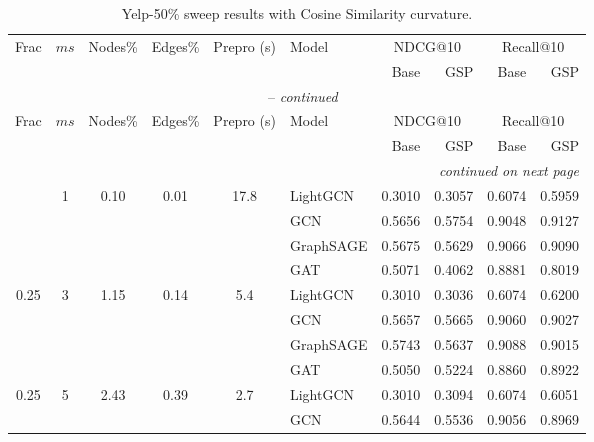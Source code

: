{\footnotesize
\setlength{\tabcolsep}{4pt}
\begin{longtable}{cccccl rrrr}
\caption{Yelp-50\% sweep results with Cosine Similarity curvature.}
\label{tab:yelp_cosine_sweep} \\
\toprule
\multirow{2}{*}{Frac} & \multirow{2}{*}{$ms$} & \multirow{2}{*}{Nodes\%} & \multirow{2}{*}{Edges\%} & \multirow{2}{*}{Prepro (s)} & \multirow{2}{*}{Model} &
  \multicolumn{2}{c}{NDCG@10} & \multicolumn{2}{c}{Recall@10} \\
\cmidrule(lr){7-8}\cmidrule(lr){9-10}
 & & & & & & Base & GSP & Base & GSP \\
\midrule
\endfirsthead
\multicolumn{10}{c}{\tablename~\thetable{} -- \textit{continued}} \\
\toprule
\multirow{2}{*}{Frac} & \multirow{2}{*}{$ms$} & \multirow{2}{*}{Nodes\%} & \multirow{2}{*}{Edges\%} & \multirow{2}{*}{Prepro (s)} & \multirow{2}{*}{Model} &
  \multicolumn{2}{c}{NDCG@10} & \multicolumn{2}{c}{Recall@10} \\
\cmidrule(lr){7-8}\cmidrule(lr){9-10}
 & & & & & & Base & GSP & Base & GSP \\
\midrule
\endhead
\midrule \multicolumn{10}{r}{\textit{continued on next page}} \\
\endfoot
\bottomrule
\endlastfoot
\multirow{4}{*}{0.25} & \multirow{4}{*}{1} & \multirow{4}{*}{0.10} & \multirow{4}{*}{0.01} & \multirow{4}{*}{17.8} & LightGCN & 0.3010 & 0.3057 & 0.6074 & 0.5959 \\
 & & & & & GCN & 0.5656 & 0.5754 & 0.9048 & 0.9127 \\
 & & & & & GraphSAGE & 0.5675 & 0.5629 & 0.9066 & 0.9090 \\
 & & & & & GAT & 0.5071 & 0.4062 & 0.8881 & 0.8019 \\
\midrule
\multirow{4}{*}{0.25} & \multirow{4}{*}{3} & \multirow{4}{*}{1.15} & \multirow{4}{*}{0.14} & \multirow{4}{*}{5.4} & LightGCN & 0.3010 & 0.3036 & 0.6074 & 0.6200 \\
 & & & & & GCN & 0.5657 & 0.5665 & 0.9060 & 0.9027 \\
 & & & & & GraphSAGE & 0.5743 & 0.5637 & 0.9088 & 0.9015 \\
 & & & & & GAT & 0.5050 & 0.5224 & 0.8860 & 0.8922 \\
\midrule
\multirow{4}{*}{0.25} & \multirow{4}{*}{5} & \multirow{4}{*}{2.43} & \multirow{4}{*}{0.39} & \multirow{4}{*}{2.7} & LightGCN & 0.3010 & 0.3094 & 0.6074 & 0.6051 \\
 & & & & & GCN & 0.5644 & 0.5536 & 0.9056 & 0.8969 \\

\end{longtable}}
